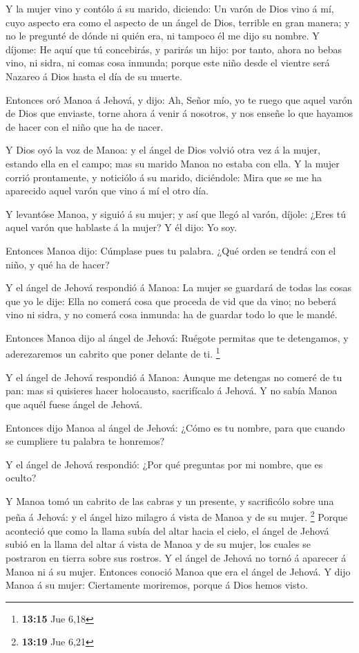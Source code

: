  Y la mujer vino y contólo á su marido, diciendo: Un varón
de Dios vino á mí, cuyo aspecto era como el aspecto de un ángel de Dios,
terrible en gran manera; y no le pregunté de dónde ni quién era, ni
tampoco él me dijo su nombre.  Y díjome: He aquí que tú
concebirás, y parirás un hijo: por tanto, ahora no bebas vino, ni sidra,
ni comas cosa inmunda; porque este niño desde el vientre será Nazareo á
Dios hasta el día de su muerte.

 Entonces oró Manoa á Jehová, y dijo: Ah, Señor mío, yo te
ruego que aquel varón de Dios que enviaste, torne ahora á venir á
nosotros, y nos enseñe lo que hayamos de hacer con el niño que ha de
nacer.

 Y Dios oyó la voz de Manoa: y el ángel de Dios volvió otra
vez á la mujer, estando ella en el campo; mas su marido Manoa no estaba
con ella.  Y la mujer corrió prontamente, y noticiólo á su
marido, diciéndole: Mira que se me ha aparecido aquel varón que vino á
mí el otro día.

 Y levantóse Manoa, y siguió á su mujer; y así que llegó al
varón, díjole: ¿Eres tú aquel varón que hablaste á la mujer? Y él dijo:
Yo soy.

 Entonces Manoa dijo: Cúmplase pues tu palabra. ¿Qué orden
se tendrá con el niño, y qué ha de hacer?

 Y el ángel de Jehová respondió á Manoa: La mujer se
guardará de todas las cosas que yo le dije:  Ella no comerá
cosa que proceda de vid que da vino; no beberá vino ni sidra, y no
comerá cosa inmunda: ha de guardar todo lo que le mandé.

 Entonces Manoa dijo al ángel de Jehová: Ruégote permitas
que te detengamos, y aderezaremos un cabrito que poner delante de ti.
\footnote{\textbf{13:15} Jue 6,18}

 Y el ángel de Jehová respondió á Manoa: Aunque me detengas
no comeré de tu pan: mas si quisieres hacer holocausto, sacrifícalo á
Jehová. Y no sabía Manoa que aquél fuese ángel de Jehová.

 Entonces dijo Manoa al ángel de Jehová: ¿Cómo es tu
nombre, para que cuando se cumpliere tu palabra te honremos?

 Y el ángel de Jehová respondió: ¿Por qué preguntas por mi
nombre, que es oculto?

 Y Manoa tomó un cabrito de las cabras y un presente, y
sacrificólo sobre una peña á Jehová: y el ángel hizo milagro á vista de
Manoa y de su mujer. \footnote{\textbf{13:19} Jue 6,21} 
Porque aconteció que como la llama subía del altar hacia el cielo, el
ángel de Jehová subió en la llama del altar á vista de Manoa y de su
mujer, los cuales se postraron en tierra sobre sus rostros.
 Y el ángel de Jehová no tornó á aparecer á Manoa ni á su
mujer. Entonces conoció Manoa que era el ángel de Jehová. 
Y dijo Manoa á su mujer: Ciertamente moriremos, porque á Dios hemos
visto.

